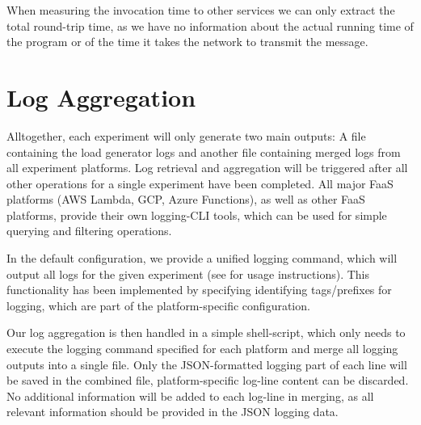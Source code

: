 \documentclass[../main.tex]{subfiles}
\begin{document}
When measuring the invocation time to other services we can only extract the total round-trip time,
as we have no information about the actual running time of the program or of the time it takes the network to transmit the message.


\section{Log Aggregation}%
\label{sec:designLogAggregation}

Alltogether, each experiment will only generate two main outputs: 
A file containing the load generator logs and another file containing merged logs from all experiment platforms.
Log retrieval and aggregation will be triggered after all other operations for a single experiment have been completed. 
All major FaaS platforms (AWS Lambda, GCP, Azure Functions), as well as other FaaS platforms, provide their own logging-CLI tools,
which can be used for simple querying and filtering operations. 

In the default configuration, we provide a unified logging command, which will output all logs for the given experiment 
(see  for usage instructions). 
This functionality has been implemented by specifying identifying tags/prefixes for logging, 
which are part of the platform-specific configuration.

Our log aggregation is then handled in a simple shell-script, which only needs to execute the logging command specified 
for each platform and merge all logging outputs into a single file. 
Only the JSON-formatted logging part of each line will be saved in the combined file, platform-specific log-line content can be discarded. 
No additional information will be added to each log-line in merging, as all relevant information should be provided in the JSON logging data.
\end{document}
